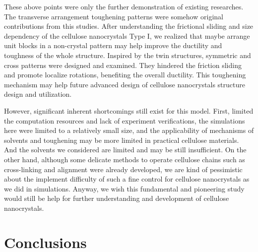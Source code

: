 \documentclass{article}
\begin{document}
These above points were only the further demonstration of existing researches.
The transverse arrangement toughening patterns were somehow original contributions from this studies.
After understanding the frictional sliding and size dependency of the cellulose nanocrystals Type I, we realized that maybe arrange unit blocks in a non-crystal pattern may help improve the ductility and toughness of the whole structure.
Inspired by the twin structures, symmetric and cross patterns were designed and examined.
They hindered the friction sliding and promote localize rotations, benefiting the overall ductility.
This toughening mechanism may help future advanced design of cellulose nanocrystals structure design and utilization.

However, significant inherent shortcomings still exist for this model.
First, limited the computation resources and lack of experiment verifications, the simulations here were limited to a relatively small size, and the applicability of mechanisms of solvents and toughening may be more limited in practical cellulose materials.
And the solvents we considered are limited and may be still insufficient.
On the other hand, although some delicate methods to operate cellulose chains such as cross-linking\cite{tu2021superior} and alignment\cite{chen2020electric,li2021ionic} were already developed,
we are kind of pessimistic about the implement difficulty of such a fine control for cellulose nanocrystals as we did in simulations.
Anyway, we wish this fundamental and pioneering study would still be help for further understanding and development of cellulose nanocrystals.

\section*{Conclusions}
\addtocounter{section}{1}
\setcounter{subsection}{0}
\indent
\end{document}
